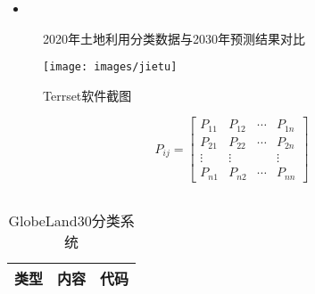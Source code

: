 \begin{itemize}
	\item 
\end{itemize}

\begin{list}{label}{spacing}
	\item 
\end{list}



	\begin{figure}[htbp]
	\centering
	\caption{2020年土地利用分类数据与2030年预测结果对比}
	\label{Fig.3}
\end{figure}


	\begin{figure}
	\centering
	\texttt{[image: images/jietu]}
	\caption{Terrset软件截图}
	\label{Fig.main.3}
\end{figure}


	\begin{equation}\label{Equa.main.2}
	P_{i j}=\left[\begin{array}{cccc}
		P_{11} & P_{12} & \cdots & P_{1 n} \\
		P_{21} & P_{22} & \cdots & P_{2 n} \\
		\vdots & \vdots & & \vdots \\
		P_{n 1} & P_{n 2} & \cdots & P_{n n}
	\end{array}\right]
\end{equation}



	\begin{columns}
	\qquad 
	\par

	\par
	
\end{columns}




	\begin{table}[htbp]
	\tiny
	\centering
	\caption{GlobeLand30分类系统}
	\begin{tabular}{c| m{24.78em}| c}
		\hline
		\textcolor[rgb]{ .2,  .2,  .2}{\textbf{类型}} &
		\centering\textcolor[rgb]{ .2,  .2,  .2}{\textbf{内容}} &
		\textcolor[rgb]{ .2,  .2,  .2}{\textbf{代码}}
		\\
		\hline
	\end{tabular}%
	\label{Table.main.1}%
\end{table}%


